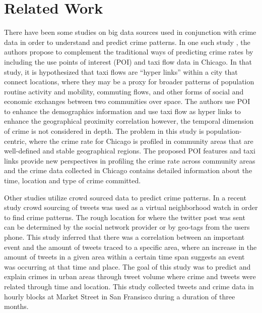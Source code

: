 \documentclass{sigkddExp}
\begin{document}

\section{Related Work}

There have been some studies on big data sources used in conjunction with crime data in order to understand and predict crime patterns. 
In one such study \cite{Wang16}, the authors propose to complement the traditional ways of predicting crime rates by including the use points of interest (POI) and taxi flow data in Chicago. 
In that study, it is hypothesized that taxi flows are ``hyper links'' within a city that connect locations, where they may be a proxy for broader patterns of population routine activity and mobility, commuting flows, and other forms of social and economic exchanges between two communities over space. The authors use POI to enhance the demographics information and use taxi flow as hyper links to enhance the geographical proximity correlation however, the temporal dimension of crime is not considered in depth. The problem in this study is population-centric, where the crime rate for Chicago is profiled in community areas that are well-defined and stable geographical regions. The proposed POI features and taxi links provide new perspectives in profiling the crime rate across community areas and the crime data collected in Chicago contains detailed information about the time, location and type of crime committed.

Other studies utilize crowd sourced data to predict crime patterns. In a recent study \cite{Bendler14} crowd sourcing of tweets was used as a virtual neighborhood watch in order to find crime patterns. The rough location for where the twitter post was sent can be determined by the social network provider or by geo-tags from the users phone. This study inferred that there was a correlation between an important event and the amount of tweets traced to a specific area, where an increase in the amount of tweets in a given area within a certain time span suggests an event was occurring at that time and place. The goal of this study was to predict and explain crimes in urban areas through tweet volume where crime and tweets were related through time and location. This study collected tweets and crime data in hourly blocks at Market Street in San Fransisco during a duration of three months. 
\end{document}

